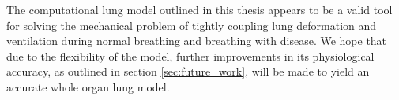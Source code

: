 




The computational lung model outlined in this thesis appears to be a valid tool for solving the mechanical problem of tightly coupling lung deformation and ventilation during normal breathing and breathing with disease. 
%
%
We hope that due to the flexibility of the model, further improvements in its physiological accuracy, as outlined in section \ref{sec:future_work}, will be made to yield an accurate whole organ lung model.

\begin{comment}
\section{Key findings}
The first part of our work developed a novel method to

Hdiv error

Reliable/stable

The second part of this thesis provided an invaluable stepping stone

Discontiinous pressure elements are good.





Finally, the third part of our thesis shows

Coupling effects are important

Parameters in Lung model are very important, at the moment unkown.
\end{comment}




